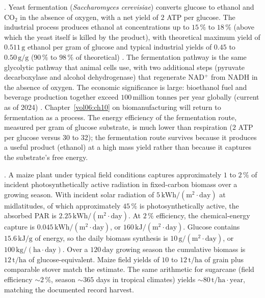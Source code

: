 . Yeast fermentation
(\emph{Saccharomyces cerevisiae}) converts glucose to ethanol and
CO$_2$ in the absence of oxygen, with a net yield of $2$ ATP per
glucose. The industrial process produces ethanol at concentrations
up to $15\,\%$ to $18\,\%$ (above which the yeast itself is killed
by the product), with theoretical maximum yield of $0.511\,\text{g}$
ethanol per gram of glucose and typical industrial yields of
$0.45$ to $0.50\,\text{g}/\text{g}$ ($90\,\%$ to $98\,\%$ of theoretical)
\cite{paper:v6c02-thauer-anaerobe-1977}. The fermentation pathway is
the same glycolytic pathway that animal cells use, with two additional
steps (pyruvate decarboxylase and alcohol dehydrogenase) that
regenerate NAD$^+$ from NADH in the absence of oxygen. The economic
significance is large: bioethanol fuel and beverage production
together exceed $100\,\text{million tonnes}$ per year globally
(current as of 2024) \cite{text:lehninger-biochemistry}.
Chapter~\ref{vol06:ch10} on biomanufacturing will return to
fermentation as a process. The energy efficiency of the fermentation
route, measured per gram of glucose substrate, is much lower than
respiration ($2$ ATP per glucose versus $30$ to $32$); the
fermentation route survives because it produces a useful product
(ethanol) at a high mass yield rather than because it captures the
substrate's free energy.

. A maize plant
under typical field conditions captures approximately $1$ to $2\,\%$
of incident photosynthetically active radiation in fixed-carbon
biomass over a growing season. With incident solar radiation of
$5\,\text{kWh}/(\text{m}^2 \cdot \text{day})$ at midlatitudes, of which
approximately $45\,\%$ is photosynthetically active, the absorbed
PAR is $2.25\,\text{kWh}/(\text{m}^2 \cdot \text{day})$. At $2\,\%$
efficiency, the chemical-energy capture is $0.045\,\text{kWh}/
(\text{m}^2 \cdot \text{day})$, or $160\,\text{kJ}/(\text{m}^2 \cdot
\text{day})$. Glucose contains $15.6\,\text{kJ}/\text{g}$ of energy,
so the daily biomass synthesis is $10\,\text{g}/(\text{m}^2 \cdot
\text{day})$, or $100\,\text{kg}/(\text{ha} \cdot \text{day})$. Over
a $120\,\text{day}$ growing season the cumulative biomass is
$12\,\text{t}/\text{ha}$ of glucose-equivalent. Maize field yields
of $10$ to $12\,\text{t}/\text{ha}$ of grain plus comparable stover
match the estimate. The same arithmetic for sugarcane (field
efficiency $\sim 2\,\%$, season $\sim 365$ days in tropical climates)
yields $\sim 80\,\text{t}/\text{ha} \cdot \text{year}$, matching the
documented record harvest.

